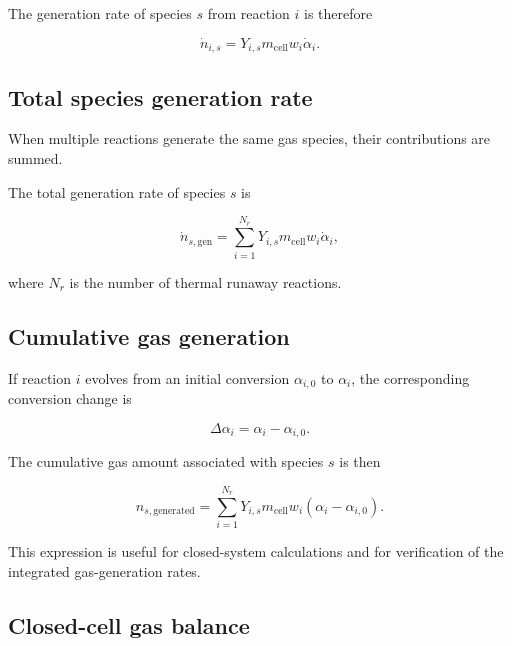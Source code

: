 The generation rate of species $s$ from reaction $i$ is therefore

\begin{equation}
    \dot{n}_{i,s}
    =
    Y_{i,s}
    m_{\mathrm{cell}}
    w_i
    \dot{\alpha}_i.
    \label{eq:species_generation_single_reaction}
\end{equation}


\subsection{Total species generation rate}

When multiple reactions generate the same gas species, their
contributions are summed.

The total generation rate of species $s$ is

\begin{equation}
    \dot{n}_{s,\mathrm{gen}}
    =
    \sum_{i=1}^{N_r}
    Y_{i,s}
    m_{\mathrm{cell}}
    w_i
    \dot{\alpha}_i,
    \label{eq:species_generation_total}
\end{equation}

where $N_r$ is the number of thermal runaway reactions.


\subsection{Cumulative gas generation}

If reaction $i$ evolves from an initial conversion
$\alpha_{i,0}$ to $\alpha_i$, the corresponding conversion change is

\begin{equation}
    \Delta \alpha_i
    =
    \alpha_i-\alpha_{i,0}.
\end{equation}

The cumulative gas amount associated with species $s$ is then

\begin{equation}
    n_{s,\mathrm{generated}}
    =
    \sum_{i=1}^{N_r}
    Y_{i,s}
    m_{\mathrm{cell}}
    w_i
    \left(
        \alpha_i-\alpha_{i,0}
    \right).
    \label{eq:cumulative_gas_generation}
\end{equation}

This expression is useful for closed-system calculations and for
verification of the integrated gas-generation rates.


\subsection{Closed-cell gas balance}

